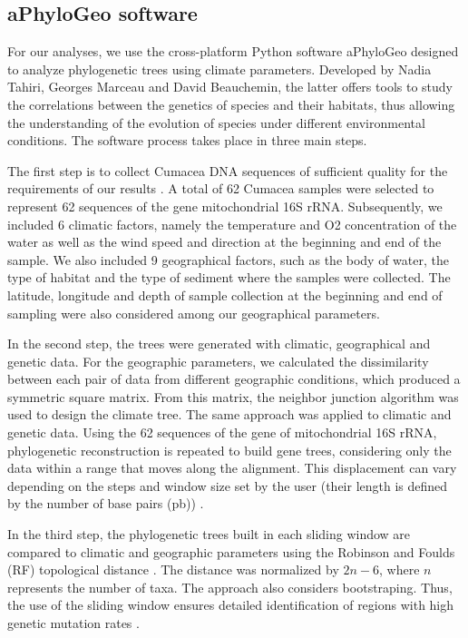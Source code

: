 \subsection{aPhyloGeo software}

For our analyses, we use the cross-platform Python software aPhyloGeo designed to analyze phylogenetic trees using climate parameters. Developed by Nadia Tahiri, Georges Marceau and David Beauchemin, the latter offers tools to study the correlations between the genetics of species and their habitats, thus allowing the understanding of the evolution of species under different environmental conditions. The software process takes place in three main steps. 

    The first step is to collect Cumacea DNA sequences of sufficient quality for the requirements of our results \citep{koshkarov_phylogeography_2022}. A total of 62 Cumacea samples were selected to represent 62 sequences of the gene mitochondrial 16S rRNA. Subsequently, we included 6 climatic factors, namely the temperature and O2 concentration of the water as well as the wind speed and direction at the beginning and end of the sample. We also included 9 geographical factors, such as the body of water, the type of habitat and the type of sediment where the samples were collected. The latitude, longitude and depth of sample collection at the beginning and end of sampling were also considered among our geographical parameters.

    In the second step, the trees were generated with climatic, geographical and genetic data. For the geographic parameters, we calculated the dissimilarity between each pair of data from different geographic conditions, which produced a symmetric square matrix. From this matrix, the neighbor junction algorithm was used to design the climate tree. The same approach was applied to climatic and genetic data. Using the 62 sequences of the gene of mitochondrial 16S rRNA, phylogenetic reconstruction is repeated to build gene trees, considering only the data within a range that moves along the alignment. This displacement can vary depending on the steps and window size set by the user (their length is defined by the number of base pairs (pb)) \citep{koshkarov_phylogeography_2022}.

    In the third step, the phylogenetic trees built in each sliding window are compared to climatic and geographic parameters using the Robinson and Foulds (RF) topological distance \citep{robinson_comparison_1981, koshkarov_phylogeography_2022}. The distance was normalized by $2n-6$, where $n$ represents the number of taxa. The approach also considers bootstraping. Thus, the use of the sliding window ensures detailed identification of regions with high genetic mutation rates \citep{koshkarov_phylogeography_2022}.

